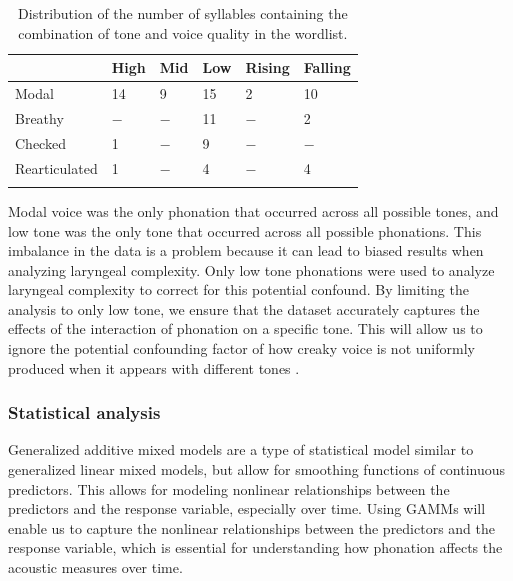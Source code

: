 \begin{table}[!h]
    \centering
    \caption{Distribution of the number of syllables containing the combination of tone and voice quality in the wordlist.}
    \label{tab:distribution_repeat}
      \begin{tabular}{llllll}
      \lsptoprule
      & High & Mid & Low & Rising & Falling\\
      \hline
      Modal & 14 & 9 & 15 & 2 & 10 \\
      Breathy & $-$ & $-$ & 11 & $-$ & 2 \\
      Checked & 1 & $-$ & 9 & $-$ & $-$ \\
      Rearticulated & 1 & $-$ & 4 & $-$ & 4 \\
      \lspbottomrule
      \end{tabular}
\end{table}

Modal voice was the only phonation that occurred across all possible tones, and low tone was the only tone that occurred across all possible phonations. This imbalance in the data is a problem because it can lead to biased results when analyzing laryngeal complexity. Only low tone phonations were used to analyze laryngeal complexity to correct for this potential confound. By limiting the analysis to only low tone, we ensure that the dataset accurately captures the effects of the interaction of phonation on a specific tone. This will allow us to ignore the potential confounding factor of how creaky voice is not uniformly produced when it appears with different tones \citep{keatingAcousticPropertiesDifferent2015}.

\subsubsection{Statistical analysis} \label{sec:statistical_analysis}

Generalized additive mixed models \citep[GAMM;][]{hastieGeneralizedAdditiveModels1986,woodGeneralizedAdditiveModels2017} are a type of statistical model similar to generalized linear mixed models, but allow for smoothing functions of continuous predictors. This allows for modeling nonlinear relationships between the predictors and the response variable, especially over time. Using GAMMs will enable us to capture the nonlinear relationships between the predictors and the response variable, which is essential for understanding how phonation affects the acoustic measures over time. 

